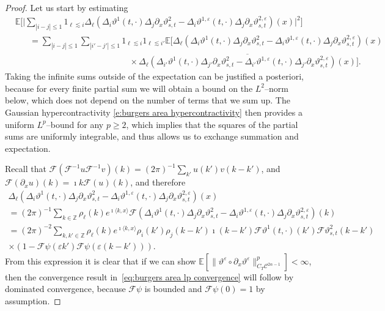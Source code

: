 \documentclass[11pt,a4paper]{article}
\theoremstyle{remark}
\newcommand{\Z}{\mathbb{Z}}
\newcommand{\E}{\mathbb{E}}
\newcommand{\CC}{\ensuremath{\mathscr{C}}}
\newcommand{\CF}{\ensuremath{\mathscr{F}}}
\begin{document}
\begin{proof}
   Let us start by estimating
   \begin{align}\label{e:burgers area pr1} \nonumber
      &\E\biggl[\biggl| \sum_{|i-j| \leqslant 1} 1_{\ell \lesssim i} \Delta_{\ell} ( \Delta_i \vartheta^1(t,\cdot) \Delta_j \partial_x \vartheta^2_{s,t} - \Delta_i \vartheta^{1,\varepsilon} (t,\cdot) \Delta_j \partial_x \vartheta^{2,\varepsilon}_{s,t})(x)\biggr|^2\biggr] \\ \nonumber
      &\hspace{20pt} = \sum_{| i - j | \leqslant 1} \sum_{| i' - j' | \leqslant 1} 1_{\ell \lesssim i} 1_{\ell \lesssim i'} \E[\Delta_{\ell} (\Delta_i \vartheta^1(t,\cdot) \Delta_j \partial_x \vartheta^2_{s,t} - \Delta_i \vartheta^{1,\varepsilon} (t,\cdot) \Delta_j \partial_x \vartheta^{2,\varepsilon}_{s,t})(x)\\
      &\hspace{160pt} \times \overline{\Delta_{\ell} ( \Delta_{i'} \vartheta^1(t,\cdot) \Delta_{j'} \partial_x \vartheta^2_{s,t} - \Delta_{i'} \vartheta^{1,\varepsilon} (t,\cdot) \Delta_{j'} \partial_x \vartheta^{2,\varepsilon}_{s,t})(x)}].
   \end{align}
   Taking the infinite sums outside of the expectation can be justified a posteriori, because for every finite partial sum we will obtain a bound on the $L^2$--norm below, which does not depend on the number of terms that we sum up. The Gaussian hypercontractivity \eqref{e:burgers area hypercontractivity} then provides a uniform $L^p$--bound for any $p \ge 2$, which implies that the squares of the partial sums are uniformly integrable, and thus allows us to exchange summation and expectation.
   
   Recall that $\CF(\CF^{-1}u \CF^{-1}v)(k) = (2\pi)^{-1} \sum_{k'} u(k') v(k -k')$, and $\CF(\partial_x u)(k) = \imath k \CF(u)(k)$, and therefore 
   \begin{gather*}
      \Delta_{\ell} (\Delta_i \vartheta^1(t,\cdot) \Delta_j \partial_x \vartheta^2_{s,t} - \Delta_i \vartheta^{1,\varepsilon} (t,\cdot) \Delta_j \partial_x \vartheta^{2,\varepsilon}_{s,t})(x) \\
      = (2\pi)^{-1} \sum_{k \in \Z} \rho_\ell(k) e^{\imath \langle k, x \rangle} \CF(\Delta_i \vartheta^1(t,\cdot) \Delta_j \partial_x \vartheta^2_{s,t} - \Delta_i \vartheta^{1,\varepsilon} (t,\cdot) \Delta_j \partial_x \vartheta^{2,\varepsilon}_{s,t})(k) \\
      = (2\pi)^{-2} \sum_{k,k' \in \Z} \rho_\ell(k) e^{\imath \langle k, x \rangle} \rho_i(k') \rho_j(k-k') \imath (k-k') \CF \vartheta^1(t,\cdot)(k') \CF\vartheta^2_{s,t}(k-k') \\
      \times (1 - \CF \psi(\varepsilon k') \CF \psi(\varepsilon(k-k'))).
   \end{gather*}
   From this expression it is clear that if we can show $\E[\| \vartheta^\varepsilon \circ \partial_x \vartheta^\varepsilon \|_{C_T \CC^{2\alpha - 1}}^p] < \infty$, then the convergence result in~\eqref{eq:burgers area lp convergence} will follow by dominated convergence, because $\CF \psi$ is bounded and $\CF \psi(0) = 1$ by assumption.
   

\end{proof}
\end{document}
